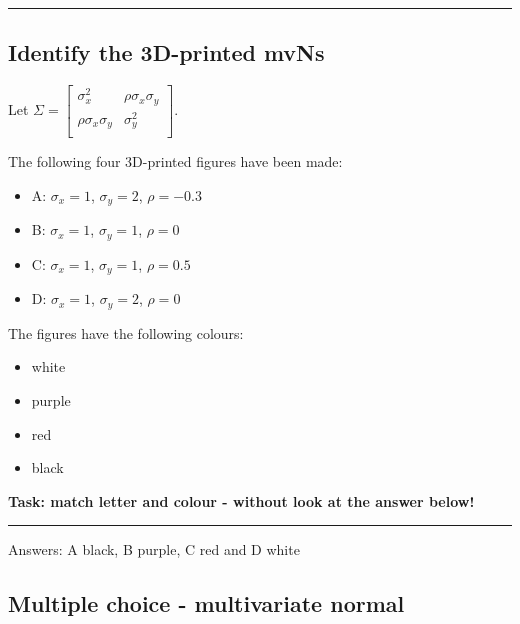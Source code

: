 \documentclass[]{article}
\providecommand{\tightlist}{%
  \setlength{\itemsep}{0pt}\setlength{\parskip}{0pt}}
\begin{document}
\begin{center}\rule{0.5\linewidth}{\linethickness}\end{center}

\hypertarget{identify-the-3d-printed-mvns}{%
\subsection{Identify the 3D-printed
mvNs}\label{identify-the-3d-printed-mvns}}

Let
\(\Sigma=\left[\begin{array}{cc} \sigma_x^2 & \rho\sigma_{x}\sigma_{y}\\\rho\sigma_{x}\sigma_{y}&\sigma_y^2\\ \end{array} \right]\).

The following four 3D-printed figures have been made:

\begin{itemize}
\tightlist
\item
  A: \(\sigma_x=1\), \(\sigma_y=2\), \(\rho=-0.3\)
\item
  B: \(\sigma_x=1\), \(\sigma_y=1\), \(\rho=0\)
\item
  C: \(\sigma_x=1\), \(\sigma_y=1\), \(\rho=0.5\)
\item
  D: \(\sigma_x=1\), \(\sigma_y=2\), \(\rho=0\)
\end{itemize}

The figures have the following colours:

\begin{itemize}
\tightlist
\item
  white
\item
  purple
\item
  red
\item
  black
\end{itemize}

\textbf{Task: match letter and colour - without look at the answer
below!}

\begin{center}\rule{0.5\linewidth}{\linethickness}\end{center}

Answers: A black, B purple, C red and D white

\hypertarget{multiple-choice---multivariate-normal}{%
\subsection{Multiple choice - multivariate
normal}\label{multiple-choice---multivariate-normal}}
\end{document}
